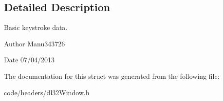 \subsection{Detailed Description}
Basic keystroke data. 

\begin{DoxyAuthor}{Author}
Manu343726 
\end{DoxyAuthor}
\begin{DoxyDate}{Date}
07/04/2013 
\end{DoxyDate}


The documentation for this struct was generated from the following file\-:\begin{DoxyCompactItemize}
\item 
code/headers/dl32\-Window.\-h\end{DoxyCompactItemize}
